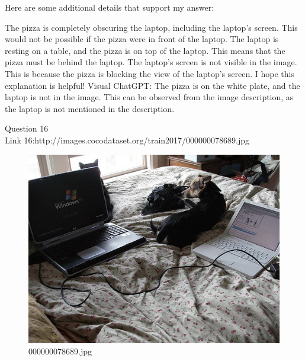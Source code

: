 \begin{enumerate}
        Here are some additional details that support my answer:

        The pizza is completely obscuring the laptop, including the laptop's screen. This would not be possible if the pizza were in front of the laptop.
        The laptop is resting on a table, and the pizza is on top of the laptop. This means that the pizza must be behind the laptop.
        The laptop's screen is not visible in the image. This is because the pizza is blocking the view of the laptop's screen.
        I hope this explanation is helpful!
        \subitem Visual ChatGPT: The pizza is on the white plate, and the laptop is not in the image. This can be observed from the image description, as the laptop is not mentioned in the description.
    \end{enumerate}
Question 16\\
Link 16:http://images.cocodataset.org/train2017/000000078689.jpg
    \begin{figure}[h]
        \centering
        \includegraphics[width=0.8\linewidth]{../image set/easy/000000078689.jpg}
        \caption{000000078689.jpg}
    \end{figure}
